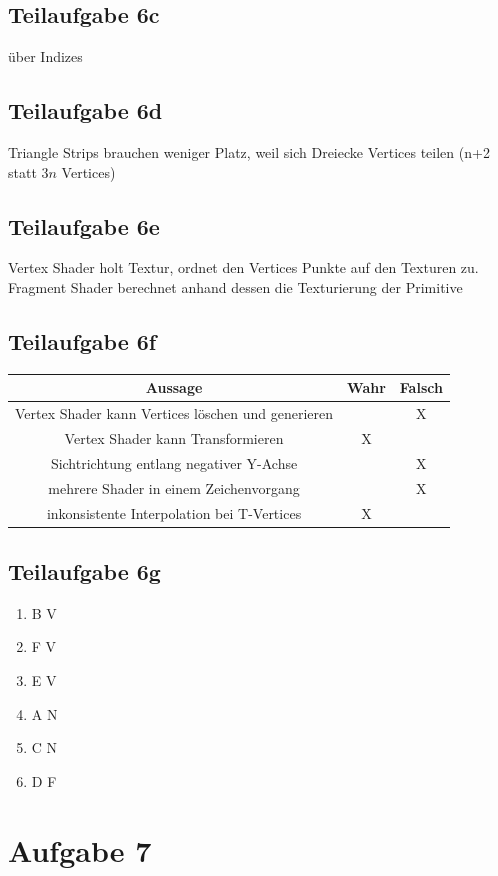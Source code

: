 \documentclass[a4paper]{scrartcl}
\begin{document}
\subsection*{Teilaufgabe 6c}
über Indizes

\subsection*{Teilaufgabe 6d}
Triangle Strips brauchen weniger Platz, weil sich Dreiecke Vertices teilen (n+2
statt $3n$ Vertices)

\subsection*{Teilaufgabe 6e}
Vertex Shader holt Textur, ordnet den Vertices Punkte auf den Texturen zu.
Fragment Shader berechnet anhand dessen die Texturierung der Primitive

\subsection*{Teilaufgabe 6f}
\begin{tabular}{|c|c|c|}\hline
    Aussage & Wahr & Falsch \\\hline
    \hline
    Vertex Shader kann Vertices löschen und generieren & & X \\
    \hline
    Vertex Shader kann Transformieren & X & \\
    \hline
    Sichtrichtung entlang negativer Y-Achse & & X \\
    \hline
    mehrere Shader in einem Zeichenvorgang & & X \\
    \hline
    inkonsistente Interpolation bei T-Vertices & X & \\
    \hline
\end{tabular}


\subsection*{Teilaufgabe 6g}
\begin{enumerate}
    \item B V
    \item F V
    \item E V
    \item A N
    \item C N
    \item D F
\end{enumerate}

\section*{Aufgabe 7}
\end{document}
